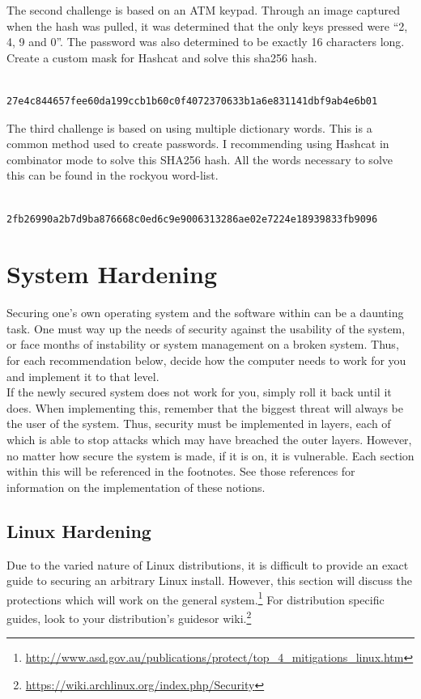 \documentclass[a4paper,11pt]{report}
\begin{document}
			The second challenge is based on an ATM keypad. 
			Through an image captured when the hash was pulled, it was determined that the only keys pressed were ``2, 4, 9 and 0''. 
			The password was also determined to be exactly 16 characters long. 
			Create a custom mask for Hashcat and solve this sha256 hash. 
			\begin{verbatim}
				27e4c844657fee60da199ccb1b60c0f4072370633b1a6e831141dbf9ab4e6b01
			\end{verbatim}

			The third challenge is based on using multiple dictionary words. 
			This is a common method used to create passwords. 
			I recommending using Hashcat in combinator mode to solve this SHA256 hash. 
			All the words necessary to solve this can be found in the rockyou word-list. 
			\begin{verbatim}
				2fb26990a2b7d9ba876668c0ed6c9e9006313286ae02e7224e18939833fb9096
			\end{verbatim}
\chapter{System Hardening}
	\label{ch:SystemHardening}
	Securing one's own operating system and the software within can be a daunting task. 
	One must way up the needs of security against the usability of the system, or face months of instability or system management on a broken system. 
	Thus, for each recommendation below, decide how the computer needs to work for you and implement it to that level.\\ 
	If the newly secured system does not work for you, simply roll it back until it does. 
	When implementing this, remember that the biggest threat will always be the user of the system. 
	Thus, security must be implemented in layers, each of which is able to stop attacks which may have breached the outer layers. However, no matter how secure the system is made, if it is on, it is vulnerable. 
	Each section within this will be referenced in the footnotes. See those references for information on the implementation of these notions. 
	\section{Linux Hardening}
		Due to the varied nature of Linux distributions, it is difficult to provide an exact guide to securing an arbitrary Linux install. 
		However, this section will discuss the protections which will work on the general system.\footnote{\url{http://www.asd.gov.au/publications/protect/top\_4\_mitigations\_linux.htm}} 
		For distribution specific guides, look to your distribution's guides\cite{FedoraSecGuide}or wiki.\footnote{\url{https://wiki.archlinux.org/index.php/Security}}
\end{document}
